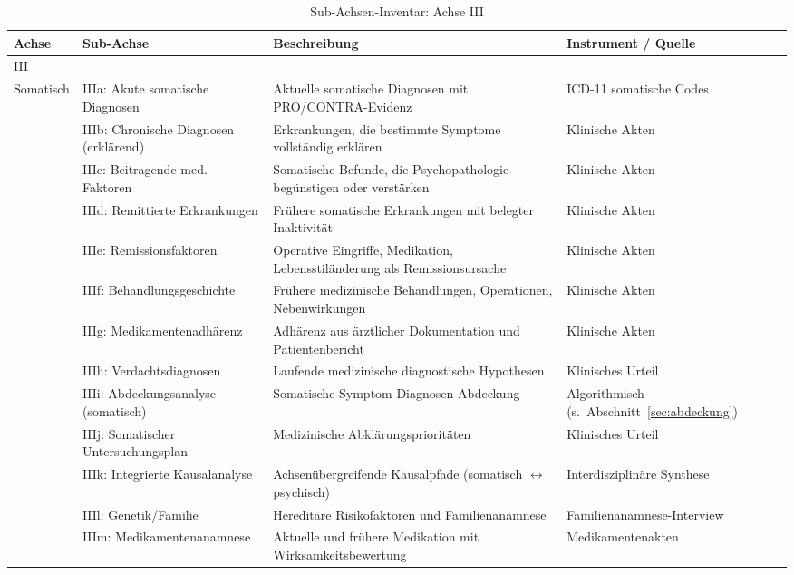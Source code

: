 \documentclass[11pt,a4paper]{article}
\newenvironment{CompactLongTable}{%
  \begingroup
  \footnotesize
  \setstretch{1.0}%
  \setlength{\LTpre}{0pt}%
  \setlength{\LTpost}{0pt}%
}{%
  \endgroup
}
\begin{document}
\begin{table}[H]
\centering
\caption{Sub-Achsen-Inventar: Achse III}
\label{tab:subaxes_part2}
\begin{CompactLongTable}
\begin{tabular}{@{}L{1.8cm}L{2.4cm}L{5.0cm}L{4.0cm}@{}}
\toprule
\textbf{Achse} & \textbf{Sub-Achse} & \textbf{Beschreibung} & \textbf{Instrument / Quelle} \\
\midrule
III\\Somatisch & IIIa: Akute somatische Diagnosen & Aktuelle somatische Diagnosen mit PRO/CONTRA-Evidenz & ICD-11 somatische Codes \\
 & IIIb: Chronische Diagnosen (erkl\"arend) & Erkrankungen, die bestimmte Symptome vollst\"andig erkl\"aren & Klinische Akten \\
 & IIIc: Beitragende med. Faktoren & Somatische Befunde, die Psychopathologie beg\"unstigen oder verst\"arken & Klinische Akten \\
 & IIId: Remittierte Erkrankungen & Fr\"uhere somatische Erkrankungen mit belegter Inaktivit\"at & Klinische Akten \\
 & IIIe: Remissionsfaktoren & Operative Eingriffe, Medikation, Lebensstil\"anderung als Remissionsursache & Klinische Akten \\
 & IIIf: Behandlungsgeschichte & Fr\"uhere medizinische Behandlungen, Operationen, Nebenwirkungen & Klinische Akten \\
 & IIIg: Medikamentenadh\"arenz & Adh\"arenz aus \"arztlicher Dokumentation und Patientenbericht & Klinische Akten \\
 & IIIh: Verdachtsdiagnosen & Laufende medizinische diagnostische Hypothesen & Klinisches Urteil \\
 & IIIi: Abdeckungsanalyse (somatisch) & Somatische Symptom-Diagnosen-Abdeckung & Algorithmisch (s.\ Abschnitt~\ref{sec:abdeckung}) \\
 & IIIj: Somatischer Untersuchungsplan & Medizinische Abkl\"arungspriorit\"aten & Klinisches Urteil \\
 & IIIk: Integrierte Kausalanalyse & Achsen\"ubergreifende Kausalpfade (somatisch $\leftrightarrow$ psychisch) & Interdisziplin\"are Synthese \\
 & IIIl: Genetik/Familie & Heredit\"are Risikofaktoren und Familienanamnese & Familien\-anamnese-Interview \\
 & IIIm: Medikamentenanamnese & Aktuelle und fr\"uhere Medikation mit Wirksamkeitsbewertung & Medikamentenakten \\
\bottomrule
\end{tabular}
\end{CompactLongTable}
\end{table}
\end{document}
